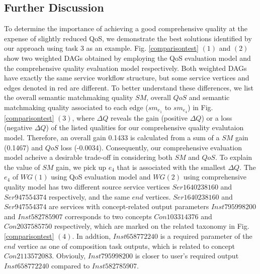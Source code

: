 \documentclass{llncs}
\begin{document}
\subsection{Further Discussion}\label{discuss1}


To determine the importance of achieving a good comprehensive quality at the expense of slightly reduced QoS, we demonstrate the best solutions identified by our approach using task 3 as an example. Fig. \ref{comparisontest} $(1)$ and $(2)$ show two weighted DAGs obtained by employing the QoS evaluation model and the comprehensive quality evaluation model respectively. Both weighted DAGs have exactly the same service workflow structure, but some service vertices and edges denoted in red are different. To better understand these differences, we list the overall semantic matchmaking quality $SM$,  overall $QoS$ and semantic matchmaking quality associated to each edge ($sm_{e_1}$ to $sm_{e_4}$) in Fig. \ref{comparisontest} $(3)$, where $\Delta Q$ reveals the gain (positive $\Delta Q$) or a loss (negative $\Delta Q$) of the listed qualities for our comprehensive quality evalutaion model. Therefore, an overall gain 0.1433 is calculated from a sum of a $SM$ gain (0.1467) and $QoS$ loss (-0.0034). Consequently, our comprehensive evaluation model acheive a desirable trade-off in considering both $SM$ and $QoS$. To explain the value of $SM$ gain, we pick up $e_4$ that is associated with the smallest $\Delta Q$. The $e_4$ of $WG(1)$ using QoS evaluation model and $WG(2)$ using comprehensive quality model has two different source service vertices $Ser1640238160$ and $Ser947554374$ respectively,  and the same $end$ vertices. $Ser1640238160$ and $Ser947554374$ are services with concept-related output parameters $Inst795998200$ and $Inst582785907$ corresponds to two concepts $Con103314376$ and $Con2037585750$ respectively, which are marked on the related taxonomy in Fig. \ref{comparisontest} $(4)$. In addtion, $Inst658772240$ is a required parameter of the $end$ vertice as one of composition task outputs, which is related to concept $Con2113572083$. Obviouly,  $Inst795998200$ is closer to user's required output $Inst658772240$ compared to $Inst582785907$.
\end{document}

